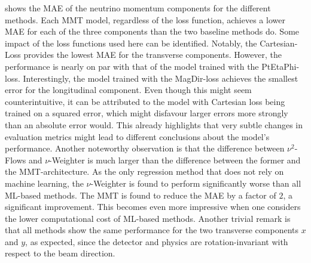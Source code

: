  shows the MAE of the neutrino momentum components for the different methods.
Each MMT model, regardless of the loss function, achieves a lower MAE for each of the three components than the two baseline methods do. Some impact of the loss functions used here can be identified. Notably, the Cartesian-Loss provides the lowest MAE for the transverse components.
However, the performance is nearly on par with that of the model trained with the PtEtaPhi-loss. Interestingly, the model trained with the MagDir-loss achieves the smallest error for the longitudinal component. Even though this might seem counterintuitive, it can be attributed to the model with Cartesian loss being trained on a squared error, which might disfavour larger errors more strongly than an absolute error would. This already highlights that very subtle changes in evaluation metrics might lead to different conclusions about the model's performance.
Another noteworthy observation is that the difference between $\nu^2$-Flows and $\nu$-Weighter is much larger than the difference between the former and the MMT-architecture. As the only regression method that does not rely on machine learning, the $\nu$-Weighter is found to perform significantly worse than all ML-based methods. The MMT is found to reduce the MAE by a factor of $2$, a significant improvement.
This becomes even more impressive when one considers the lower computational cost of ML-based methods.
Another trivial remark is that all methods show the same performance for the two transverse components $x$ and $y$, as expected, since the detector and physics are rotation-invariant with respect to the beam direction.
\begin{table}[ht]
    \centering
    \caption{Summary of the MAE of the neutrinos'
        $p_T$, $\eta$, $\phi$, and $E$, evaluated for the different methods. Note that the computation of the error in $\phi$ was     performed periodically.}
    
    \label{tab:mae:PtEtaPhiE}
\end{table}%

